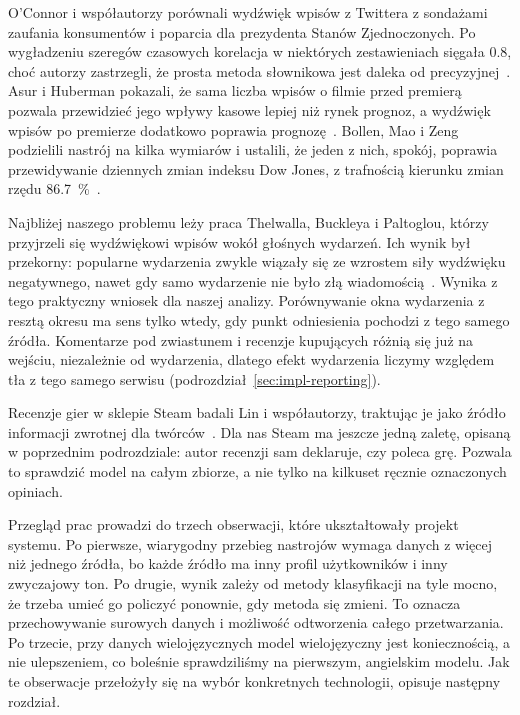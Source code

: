 O'Connor i współautorzy porównali wydźwięk wpisów z Twittera z sondażami zaufania konsumentów i poparcia dla prezydenta Stanów Zjednoczonych.
Po wygładzeniu szeregów czasowych korelacja w niektórych zestawieniach sięgała \num{0.8}, choć autorzy zastrzegli, że prosta metoda słownikowa jest daleka od precyzyjnej~\cite{oconnor2010tweets}.
Asur i Huberman pokazali, że sama liczba wpisów o filmie przed premierą pozwala przewidzieć jego wpływy kasowe lepiej niż rynek prognoz, a wydźwięk wpisów po premierze dodatkowo poprawia prognozę~\cite{asur2010predicting}.
Bollen, Mao i Zeng podzielili nastrój na kilka wymiarów i ustalili, że jeden z nich, spokój, poprawia przewidywanie dziennych zmian indeksu Dow Jones, z trafnością kierunku zmian rzędu \qty{86.7}{\percent}~\cite{bollen2011twitter}.

Najbliżej naszego problemu leży praca Thelwalla, Buckleya i Paltoglou, którzy przyjrzeli się wydźwiękowi wpisów wokół głośnych wydarzeń.
Ich wynik był przekorny: popularne wydarzenia zwykle wiązały się ze wzrostem siły wydźwięku negatywnego, nawet gdy samo wydarzenie nie było złą wiadomością~\cite{thelwall2011sentiment}.
Wynika z tego praktyczny wniosek dla naszej analizy.
Porównywanie okna wydarzenia z resztą okresu ma sens tylko wtedy, gdy punkt odniesienia pochodzi z tego samego źródła.
Komentarze pod zwiastunem i recenzje kupujących różnią się już na wejściu, niezależnie od wydarzenia, dlatego efekt wydarzenia liczymy względem tła z tego samego serwisu (podrozdział~\ref{sec:impl-reporting}).

Recenzje gier w sklepie Steam badali Lin i współautorzy, traktując je jako źródło informacji zwrotnej dla twórców~\cite{lin2019empirical}.
Dla nas Steam ma jeszcze jedną zaletę, opisaną w poprzednim podrozdziale: autor recenzji sam deklaruje, czy poleca grę.
Pozwala to sprawdzić model na całym zbiorze, a nie tylko na kilkuset ręcznie oznaczonych opiniach.

Przegląd prac prowadzi do trzech obserwacji, które ukształtowały projekt systemu.
Po pierwsze, wiarygodny przebieg nastrojów wymaga danych z więcej niż jednego źródła, bo każde źródło ma inny profil użytkowników i inny zwyczajowy ton.
Po drugie, wynik zależy od metody klasyfikacji na tyle mocno, że trzeba umieć go policzyć ponownie, gdy metoda się zmieni.
To oznacza przechowywanie surowych danych i możliwość odtworzenia całego przetwarzania.
Po trzecie, przy danych wielojęzycznych model wielojęzyczny jest koniecznością, a nie ulepszeniem, co boleśnie sprawdziliśmy na pierwszym, angielskim modelu.
Jak te obserwacje przełożyły się na wybór konkretnych technologii, opisuje następny rozdział.
